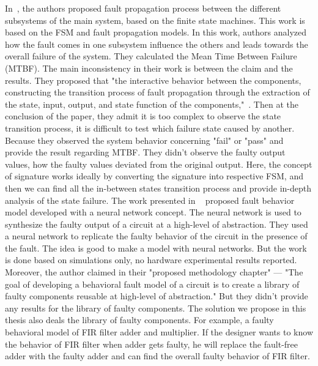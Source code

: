 In~\citep{chen2017fault}, the authors proposed fault propagation process between the different subsystems of the
main system, based on the finite state machines. This work is based on the FSM and fault propagation models. In this work, authors analyzed how the fault comes in one subsystem influence the others and leads towards the overall failure of the system. They calculated the Mean Time Between Failure (MTBF). The main inconsistency in their work is between the claim and the results. They proposed that "the interactive behavior between the components, constructing the transition process of fault propagation through the extraction of the state, input, output, and state function of the components,"~\citep{chen2017fault}. Then at the conclusion of the paper, they admit it is too complex to observe the state transition process, it is difficult to test which failure state caused by another. Because they observed the system behavior concerning "fail" or "pass"  and provide the result regarding  MTBF. They didn't observe the faulty output values, how the faulty values deviated from the original output. Here, the concept of signature works ideally by converting the signature into respective FSM, and then we can find all the in-between states transition process and provide in-depth analysis of the state failure.  
The work presented in ~\citep{mirzadeh2014modeling} proposed fault behavior model developed with a neural network
concept. The neural network is used to synthesize the faulty output of a
circuit at a high-level of abstraction. They used a neural network to replicate the faulty behavior of the circuit in the presence of the fault. The idea is good to make a model with neural networks. But the work is done based on simulations only, no hardware experimental results reported. Moreover, the author claimed in their "proposed methodology chapter"  --- "The goal of developing a behavioral fault model of a circuit is to create a library of faulty components reusable at high-level of abstraction." But they didn't provide any results for the library of faulty components. The solution we propose in this thesis also deals the library of faulty components. For example, a faulty behavioral model of FIR filter adder and multiplier. If the designer wants to know the behavior of FIR filter when adder gets faulty, he will replace the fault-free adder with the faulty adder and can find the overall faulty behavior of FIR filter.
